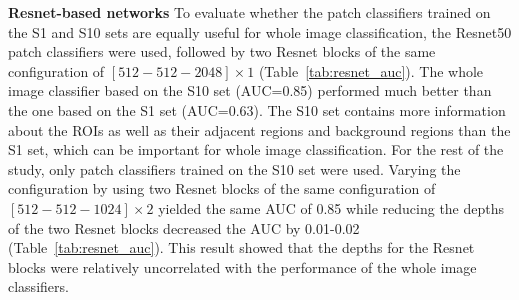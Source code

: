 \documentclass[12pt,letterpaper]{article}
\begin{document}
\textbf{Resnet-based networks}
\label{resnet_auc}
To evaluate whether the patch classifiers trained on the S1 and S10 sets are equally useful for whole image classification, the Resnet50 patch classifiers were used, followed by two Resnet blocks of the same configuration of $[512-512-2048] \times 1$ (Table~\ref{tab:resnet_auc}). The whole image classifier based on the S10 set (AUC=0.85) performed much better than the one based on the S1 set (AUC=0.63). The S10 set contains more information about the ROIs as well as their adjacent regions and background regions than the S1 set, which can be important for whole image classification. For the rest of the study, only patch classifiers trained on the S10 set were used. Varying the configuration by using two Resnet blocks of the same configuration of $[512-512-1024] \times 2$ yielded the same AUC of 0.85 while reducing the depths of the two Resnet blocks decreased the AUC by 0.01-0.02 (Table~\ref{tab:resnet_auc}). This result showed that the depths for the Resnet blocks were relatively uncorrelated with the performance of the whole image classifiers.
\end{document}
